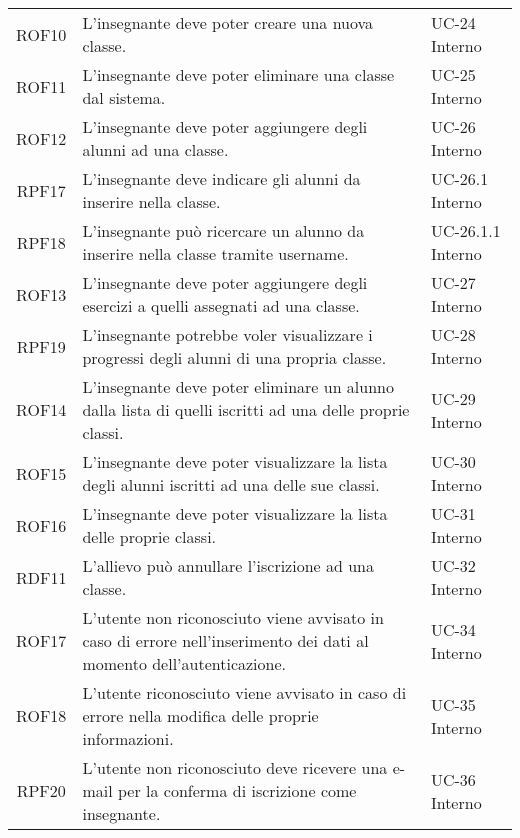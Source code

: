 \begin{tabularx}{\textwidth}{| c | p{10cm} | X |}
		ROF10 & L'insegnante deve poter creare una nuova classe. & UC-24 \newline Interno\\
		ROF11 & L'insegnante deve poter eliminare una classe dal sistema. & UC-25 \newline Interno\\
		ROF12 & L'insegnante deve poter aggiungere degli alunni ad una classe. & UC-26 \newline Interno\\
		RPF17 & L'insegnante deve indicare gli alunni da inserire nella classe. & UC-26.1 \newline Interno\\
		RPF18 & L'insegnante può ricercare un alunno da inserire nella classe tramite username. & UC-26.1.1 \newline Interno\\
		ROF13 & L'insegnante deve poter aggiungere degli esercizi a quelli assegnati ad una classe. & UC-27 \newline Interno\\
		RPF19 & L'insegnante potrebbe voler visualizzare i progressi degli alunni di una propria classe. & UC-28 \newline Interno\\
		ROF14 & L'insegnante deve poter eliminare un alunno dalla lista di quelli iscritti ad una delle proprie classi. & UC-29 \newline Interno\\
		ROF15 & L'insegnante deve poter visualizzare la lista degli alunni iscritti ad una delle sue classi. & UC-30 \newline Interno\\
		ROF16 & L'insegnante deve poter visualizzare la lista delle proprie classi. & UC-31 \newline Interno\\
		RDF11 & L'allievo può annullare l'iscrizione ad una classe. & UC-32 \newline Interno\\
		ROF17 & L'utente non riconosciuto viene avvisato in caso di errore nell'inserimento dei dati al momento dell'autenticazione. & UC-34 \newline Interno\\
		ROF18 & L'utente riconosciuto viene avvisato in caso di errore nella modifica delle proprie informazioni. & UC-35 \newline Interno\\
		RPF20 & L'utente non riconosciuto deve ricevere una e-mail per la conferma di iscrizione come insegnante. & UC-36 \newline Interno\\

\end{tabularx}
